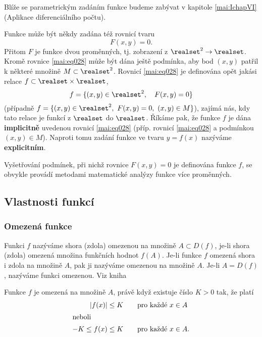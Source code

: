         
      
      Blíže se parametrickým zadáním funkce budeme zabývat v kapitole \ref{mai:IchapVI}
      (Aplikace diferenciálního počtu).
      
      Funkce může být někdy zadána též rovnicí tvaru 
      \begin{equation}\label{mai:eq028}
        F(x,y) = 0.
      \end{equation}
      Přitom $F$ je funkce dvou proměnných, tj. zobrazení z $\realset^2\rightarrow\realset$. Kromě 
      rovnice \ref{mai:eq028} může být dána ještě podmínka, aby bod $(x,y)$ patřil k některé 
      množině $M\subset\realset^2$. Rovnicí \ref{mai:eq028} je definována opět jakási relace 
      $f\subset\realset\times\realset$,
      \begin{equation}
        f = \{(x,y)\in\realset^2,\quad F(x,y)=0 \}
      \end{equation}
      (případně $f = \{(x,y)\in\realset^2,\ F(x,y)=0,\ (x,y)\in M \}$), zajímá nás, kdy tato relace 
      je funkcí z \(\realset\) do \(\realset\). Říkáme pak, že funkce $f$ je dána \textbf{implicitně} 
      uvedenou rovnicí \ref{mai:eq028} (příp. rovnicí \ref{mai:eq028} a podmínkou $(x,y)\in 
      M$). Naproti tomu zadání funkce ve tvaru $y=f(x)$ nazýváme \textbf{explicitním}.

        
      
      Vyšetřování podmínek, při nichž rovnice $F(x,y)=0$ je definována funkce $f$, se obvykle 
      provádí metodami matematické analýzy funkce více proměnných. 
          
    \subsection{Vlastnosti funkcí}\label{mai:IchapIIIsecIssecIII}
      \subsubsection{Omezená funkce}
        \begin{definition}\label{MA1:def_lim01}
          Funkci $f$ nazýváme shora (zdola) omezenou na množině $A\subset D(f)$, je-li shora 
          (zdola) omezená množina funkčních hodnot $f(A)$. Je-li funkce $f$ omezená shora i zdola 
          na množině $A$, pak ji nazýváme omezenou na množině $A$. Je-li $A=D(f)$, nazýváme funkci 
          omezenou. Viz kniha \cite[s.~87]{Brabec1989}       
        \end{definition}
        Funkce \(f\) je omezená na množině \(A\), právě když existuje číslo \(K>0\) tak, že platí
        \begin{align*}
         \lvert f(x)\rvert  &\leq K \qquad \text{pro každé } x\in A   \\ 
         \shortintertext{neboli}
         -K\leq f(x) &\leq K \qquad \text{pro každé } x\in A. 
        \end{align*}

